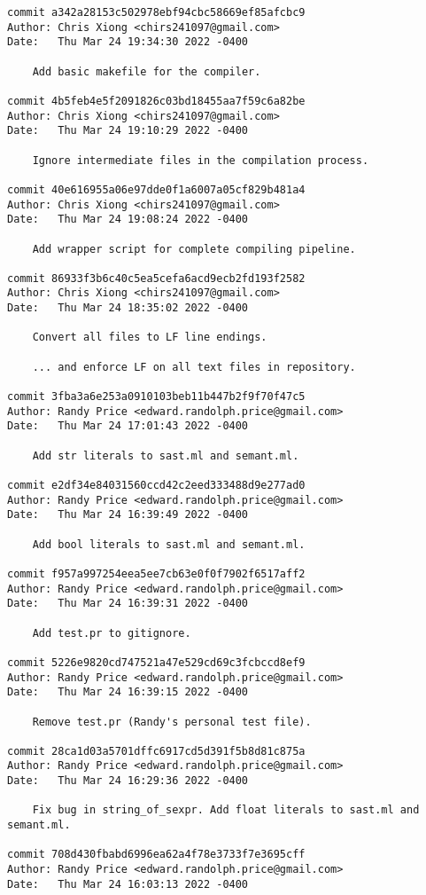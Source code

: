 {\begin{verbatim}
commit a342a28153c502978ebf94cbc58669ef85afcbc9
Author: Chris Xiong <chirs241097@gmail.com>
Date:   Thu Mar 24 19:34:30 2022 -0400

    Add basic makefile for the compiler.

commit 4b5feb4e5f2091826c03bd18455aa7f59c6a82be
Author: Chris Xiong <chirs241097@gmail.com>
Date:   Thu Mar 24 19:10:29 2022 -0400

    Ignore intermediate files in the compilation process.

commit 40e616955a06e97dde0f1a6007a05cf829b481a4
Author: Chris Xiong <chirs241097@gmail.com>
Date:   Thu Mar 24 19:08:24 2022 -0400

    Add wrapper script for complete compiling pipeline.

commit 86933f3b6c40c5ea5cefa6acd9ecb2fd193f2582
Author: Chris Xiong <chirs241097@gmail.com>
Date:   Thu Mar 24 18:35:02 2022 -0400

    Convert all files to LF line endings.
    
    ... and enforce LF on all text files in repository.

commit 3fba3a6e253a0910103beb11b447b2f9f70f47c5
Author: Randy Price <edward.randolph.price@gmail.com>
Date:   Thu Mar 24 17:01:43 2022 -0400

    Add str literals to sast.ml and semant.ml.

commit e2df34e84031560ccd42c2eed333488d9e277ad0
Author: Randy Price <edward.randolph.price@gmail.com>
Date:   Thu Mar 24 16:39:49 2022 -0400

    Add bool literals to sast.ml and semant.ml.

commit f957a997254eea5ee7cb63e0f0f7902f6517aff2
Author: Randy Price <edward.randolph.price@gmail.com>
Date:   Thu Mar 24 16:39:31 2022 -0400

    Add test.pr to gitignore.

commit 5226e9820cd747521a47e529cd69c3fcbccd8ef9
Author: Randy Price <edward.randolph.price@gmail.com>
Date:   Thu Mar 24 16:39:15 2022 -0400

    Remove test.pr (Randy's personal test file).

commit 28ca1d03a5701dffc6917cd5d391f5b8d81c875a
Author: Randy Price <edward.randolph.price@gmail.com>
Date:   Thu Mar 24 16:29:36 2022 -0400

    Fix bug in string_of_sexpr. Add float literals to sast.ml and semant.ml.

commit 708d430fbabd6996ea62a4f78e3733f7e3695cff
Author: Randy Price <edward.randolph.price@gmail.com>
Date:   Thu Mar 24 16:03:13 2022 -0400


\end{verbatim}}
